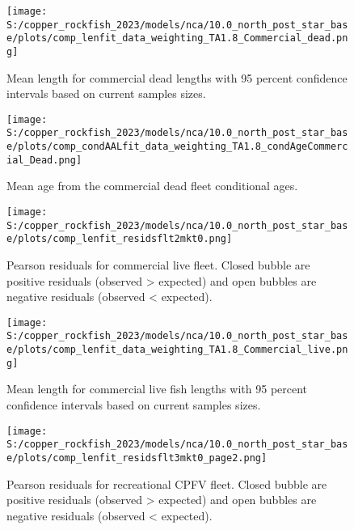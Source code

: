 \documentclass[11pt,
  letterpaper,
]{article}
\begin{document}
\pagebreak

\begin{figure}
{\centering
\texttt{[image: S:/copper\_rockfish\_2023/models/nca/10.0\_north\_post\_star\_base/plots/comp\_lenfit\_data\_weighting\_TA1.8\_Commercial\_dead.png]}
}
\caption{Mean length for commercial dead lengths with 95 percent confidence intervals based on current samples sizes.\label{fig:com-dead-mean-len-fit}}
\end{figure}

\pagebreak

\begin{figure}
{\centering
\texttt{[image: S:/copper\_rockfish\_2023/models/nca/10.0\_north\_post\_star\_base/plots/comp\_condAALfit\_data\_weighting\_TA1.8\_condAgeCommercial\_Dead.png]}
}
\caption{Mean age from the commercial dead fleet conditional ages.\label{fig:com-dead-mean-age}}
\end{figure}

\pagebreak

\begin{figure}
{\centering
\texttt{[image: S:/copper\_rockfish\_2023/models/nca/10.0\_north\_post\_star\_base/plots/comp\_lenfit\_residsflt2mkt0.png]}
}
\caption{Pearson residuals for commercial live fleet. Closed bubble are positive residuals (observed > expected) and open bubbles are negative residuals (observed < expected).\label{fig:com-live-pearson}}
\end{figure}

\pagebreak

\begin{figure}
{\centering
\texttt{[image: S:/copper\_rockfish\_2023/models/nca/10.0\_north\_post\_star\_base/plots/comp\_lenfit\_data\_weighting\_TA1.8\_Commercial\_live.png]}
}
\caption{Mean length for commercial live fish lengths with 95 percent confidence intervals based on current samples sizes.\label{fig:com-live-mean-len-fit}}
\end{figure}

\pagebreak

\begin{figure}
{\centering
\texttt{[image: S:/copper\_rockfish\_2023/models/nca/10.0\_north\_post\_star\_base/plots/comp\_lenfit\_residsflt3mkt0\_page2.png]}
}
\caption{Pearson residuals for recreational CPFV fleet. Closed bubble are positive residuals (observed > expected) and open bubbles are negative residuals (observed < expected).\label{fig:rec-cpfv-pearson}}
\end{figure}
\end{document}
